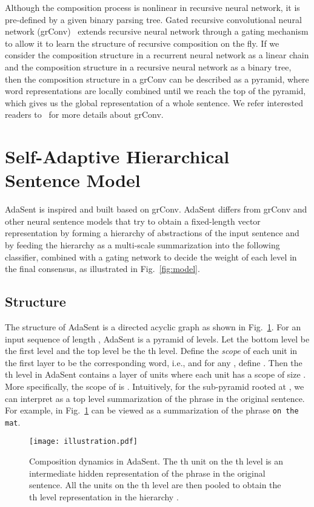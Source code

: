 \documentclass{article}
\theoremstyle{definition}
\begin{document}
Although the composition process is nonlinear in recursive neural network, it is pre-defined by a given binary parsing tree. Gated recursive convolutional neural network (grConv)~\cite{cho2014properties} extends recursive neural network through a gating mechanism to allow it to learn the structure of recursive composition on the fly. If we consider the composition structure in a recurrent neural network as a linear chain and the composition structure in a recursive neural network as a binary tree, then the composition structure in a grConv can be described as a pyramid, where word representations are locally combined until we reach the top of the pyramid, which gives us the global representation of a whole sentence. We refer interested readers to~\cite{cho2014properties} for more details about grConv.

\section{Self-Adaptive Hierarchical Sentence Model}
\label{sec:adasent}
AdaSent is inspired and built based on grConv. AdaSent differs from grConv and other neural sentence models that try to obtain a fixed-length vector representation by forming a hierarchy of abstractions of the input sentence and by feeding the hierarchy as a multi-scale summarization into the following classifier, combined with a gating network to decide the weight of each level in the final consensus, as illustrated in Fig.~\ref{fig:model}. 

\subsection{Structure}
The structure of AdaSent is a directed acyclic graph as shown in Fig.~\ref{fig:illustration}. For an input sequence of length , AdaSent is a pyramid of  levels. Let the bottom level be the first level and the top level be the th level. Define the \emph{scope} of each unit in the first layer to be the corresponding word, i.e.,  and for any , define . Then the th level in AdaSent contains a layer of  units where each unit has a scope of size . More specifically, the scope of  is . Intuitively, for the sub-pyramid rooted at , we can interpret  as a top level summarization of the phrase  in the original sentence. For example,  in Fig.~\ref{fig:illustration} can be viewed as a summarization of the phrase \texttt{on the mat}.
\begin{figure}[htb]
\centering
	\texttt{[image: illustration.pdf]}
\caption{Composition dynamics in AdaSent. The th unit on the th level is an intermediate hidden representation of the phrase  in the original sentence. All the units on the th level are then pooled to obtain the th level representation in the hierarchy .}
\label{fig:illustration}
\end{figure}
\end{document}
